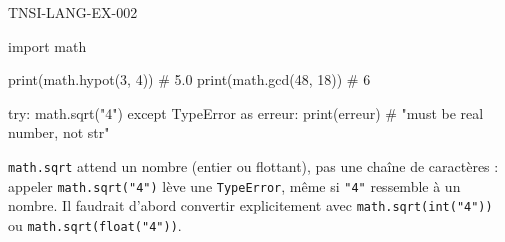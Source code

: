 \begin{corrige}{TNSI-LANG-EX-002}
\begin{python}
import math

print(math.hypot(3, 4))  # 5.0
print(math.gcd(48, 18))  # 6

try:
    math.sqrt("4")
except TypeError as erreur:
    print(erreur)  # "must be real number, not str"
\end{python}
\lstinline{math.sqrt} attend un nombre (entier ou flottant), pas une chaîne de caractères : appeler \lstinline{math.sqrt("4")} lève une \lstinline{TypeError}, même si \lstinline{"4"} \og ressemble \fg{} à un nombre. Il faudrait d'abord convertir explicitement avec \lstinline{math.sqrt(int("4"))} ou \lstinline{math.sqrt(float("4"))}.
\end{corrige}

